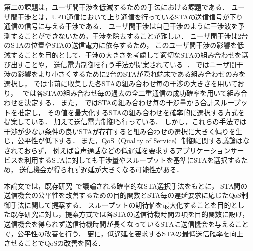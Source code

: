 \documentclass[master]{kuisthesis}		%
\begin{document}
\par
第二の課題は，ユーザ間干渉を低減するための手法における課題である．
ユーザ間干渉とは，UFD通信において上り通信を行っているSTAの送信信号が下り通信の信号に与える干渉である．
ユーザ間干渉は自己干渉のように干渉波を予測することができないため，干渉を除去することが難しい．
ユーザ間干渉は2台のSTAの位置やSTAの送信電力に依存するため，
このユーザ間干渉の影響を低減することを目的として，干渉の大きさを考慮して適切なSTAの組み合わせを選び出すことや，
送信電力制御を行う手法が提案されている~\cite{contra,janus, fdmac3, goyal,promac}．
\cite{fdmac3}ではユーザ間干渉の影響をより小さくするために2台のSTAが隠れ端末である組み合わせのみを選択し，
\cite{janus,goyal}では事前に収集した各STAの組み合わせ毎の干渉の大きさを用いており，
~\cite{contra}では各STAの組み合わせ毎の過去の全二重通信の成功確率を用いて組み合わせを決定する．
また，~\cite{promac}ではSTAの組み合わせ毎の干渉量から合計スループットを推定し，
その値を最大化するSTAの組み合わせを確率的に選択する方式を提案している．
加えて送信電力制御も行っている．
しかし，これらの手法では干渉が少ない条件の良いSTAが存在すると組み合わせの選択に大きく偏りを生じ，公平性が低下する．
また，QoS（Quality of Service）制御に関する議論はなされておらず，
例えば音声通話などの低遅延を要求するアプリケーションサービスを利用するSTAに対しても干渉量やスループットを基準にSTAを選択するため，
送信機会が得られず遅延が大きくなる可能性がある．
\par
本論文では，既存研究~\cite{promac}で議論される確率的なSTA選択手法をもとに，
STA間の送信機会の公平性を改善するための目的関数とSTA毎の遅延要求に応じたQoS制御手法に関して提案する．
スループットの期待値を最大化することを目的とした既存研究に対し，提案方式では各STAの送信待機時間の項を目的関数に設け，
送信機会を得られず送信待機時間が長くなっているSTAに送信機会を与えることで，公平性の改善を行う．
更に，低遅延を要求するSTAの最低送信確率を向上させることでQoSの改善を図る．
\end{document}
